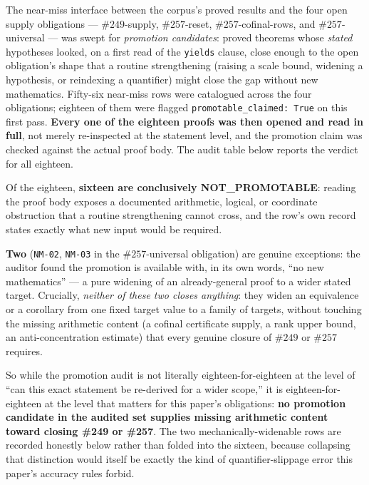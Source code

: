 \documentclass[11pt]{article}
\theoremstyle{breakplain}
\theoremstyle{breakdefinition}
\theoremstyle{breakdefinition}
\begin{document}
The near-miss interface between the corpus's proved results and the four
open supply obligations — \(\#249\)-supply, \(\#257\)-reset,
\(\#257\)-cofinal-rows, and \(\#257\)-universal — was swept for
\emph{promotion candidates}: proved theorems whose \emph{stated} hypotheses
looked, on a first read of the \texttt{yields} clause, close enough to the
open obligation's shape that a routine strengthening (raising a scale bound,
widening a hypothesis, or reindexing a quantifier) might close the gap
without new mathematics. Fifty-six near-miss rows were catalogued across the
four obligations; eighteen of them were flagged \texttt{promotable\_claimed:
True} on this first pass. \textbf{Every one of the eighteen proofs was then
opened and read in full}, not merely re-inspected at the statement level,
and the promotion claim was checked against the actual proof body. The
audit table below reports the verdict for all eighteen.

Of the eighteen, \textbf{sixteen are conclusively NOT\_PROMOTABLE}: reading
the proof body exposes a documented arithmetic, logical, or coordinate
obstruction that a routine strengthening cannot cross, and the row's own
record states exactly what new input would be required.

\textbf{Two}
(\texttt{NM-02}, \texttt{NM-03} in the \(\#257\)-universal obligation) are
genuine exceptions: the auditor found the promotion is available with, in
its own words, ``no new mathematics'' — a pure widening of an already-general
proof to a wider stated target. Crucially, \emph{neither of these two closes
anything}: they widen an equivalence or a corollary from one fixed target
value to a family of targets, without touching the missing arithmetic
content (a cofinal certificate supply, a rank upper bound, an anti-concentration
estimate) that every genuine closure of \(\#249\) or \(\#257\) requires.

So
while the promotion audit is not literally eighteen-for-eighteen at the level
of ``can this exact statement be re-derived for a wider scope,'' it is
eighteen-for-eighteen at the level that matters for this paper's obligations:
\textbf{no promotion candidate in the audited set supplies missing arithmetic
content toward closing \#249 or \#257}. The two mechanically-widenable rows
are recorded honestly below rather than folded into the sixteen, because
collapsing that distinction would itself be exactly the kind of
quantifier-slippage error this paper's accuracy rules forbid.
\end{document}
